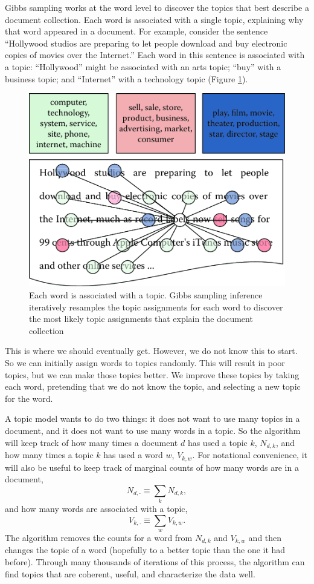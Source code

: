 \documentclass[]{krantz}
\begin{document}
Gibbs sampling works at the word level to discover the topics that best
describe a document collection. Each word is associated with a single
topic, explaining why that word appeared in a document. For example,
consider the sentence ``Hollywood studios are preparing to let people
download and buy electronic copies of movies over the Internet.'' Each
word in this sentence is associated with a topic: ``Hollywood'' might be
associated with an arts topic; ``buy'' with a business topic; and
``Internet'' with a technology topic (Figure \ref{fig:inference-1}).

\begin{figure}

{\centering \includegraphics[width=0.7\linewidth]{ChapterText/figures/inference_1} 

}

\caption{Each word is associated with a topic. Gibbs sampling inference iteratively resamples the topic assignments for each word to discover the most likely topic assignments that explain the document collection}\label{fig:inference-1}
\end{figure}

This is where we should eventually get. However, we do not know this to
start. So we can initially assign words to topics randomly. This will
result in poor topics, but we can make those topics better. We improve
these topics by taking each word, pretending that we do not know the
topic, and selecting a new topic for the word.

A topic model wants to do two things: it does not want to use many
topics in a document, and it does not want to use many words in a topic.
So the algorithm will keep track of how many times a document \(d\) has
used a topic \(k\), \(N_{d,k}\), and how many times a topic \(k\) has
used a word \(w\), \(V_{k,w}\). For notational convenience, it will also
be useful to keep track of marginal counts of how many words are in a
document, \[N_{d, \cdot} \equiv \sum_k N_{d,k},\] and how many words are
associated with a topic, \[V_{k, \cdot} \equiv \sum_w V_{k, w}.\] The
algorithm removes the counts for a word from \(N_{d,k}\) and \(V_{k,w}\)
and then changes the topic of a word (hopefully to a better topic than
the one it had before). Through many thousands of iterations of this
process, the algorithm can find topics that are coherent, useful, and
characterize the data well.
\end{document}

